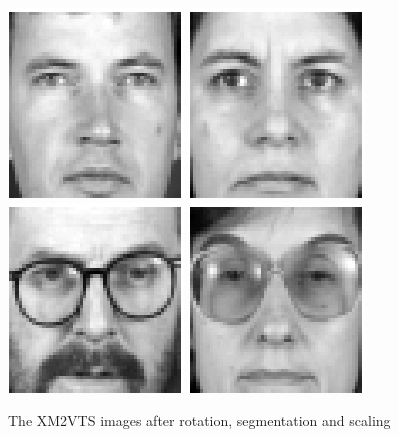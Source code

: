 \begin{figure}
\begin{center}
\includegraphics[scale=0.12]{ch4/figures/XM2VTS_61.png}
\includegraphics[scale=0.12]{ch4/figures/XM2VTS_62.png}
\includegraphics[scale=0.12]{ch4/figures/XM2VTS_63.png}
\includegraphics[scale=0.12]{ch4/figures/XM2VTS_64.png}\\
\caption{The XM2VTS images after rotation, segmentation and scaling}
\label{fig:XM2VTSface}
\end{center}
\end{figure}


